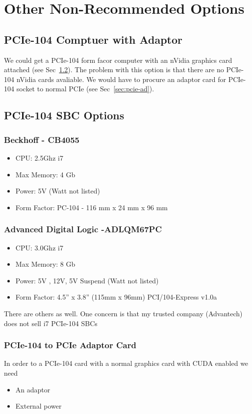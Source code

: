 \documentclass{article}
\begin{document}
\section{Other Non-Recommended Options}
\subsection{PCIe-104 Comptuer with Adaptor}
We could get a PCIe-104 form facor computer with an nVidia graphics card attached (see Sec~\ref{sec:pcie-op}).  
The problem with this option is that there are no PCIe-104 nVidia cards avaliable.
We would have to procure an adaptor card for PCIe-104 socket to normal PCIe (see Sec~\ref{sec:pcie-ad}).

\subsection{PCIe-104 SBC Options}\label{sec:pcie-op}
\subsubsection{Beckhoff - CB4055}
\begin{itemize}
\item CPU: 2.5Ghz i7
\item Max Memory: 4 Gb
\item Power: 5V (Watt not listed)
\item Form Factor: PC-104 - 116 mm x 24 mm x 96 mm
\end{itemize}

\subsubsection{Advanced Digital Logic -ADLQM67PC}
\begin{itemize}
\item CPU: 3.0Ghz i7
\item Max Memory: 8 Gb
\item Power: 5V , 12V, 5V Suspend (Watt not listed)
\item Form Factor: 4.5” x 3.8” (115mm x 96mm) PCI/104-Express v1.0a
\end{itemize}

There are others as well.  One concern is that my trusted company (Advantech) does not sell i7 PCIe-104 SBCs

\subsubsection{PCIe-104 to PCIe Adaptor Card}
In order to a PCIe-104 card with a normal graphics card with CUDA enabled we need 
\begin{itemize}
\item An adaptor
\item External power
\end{itemize}
\end{document}
